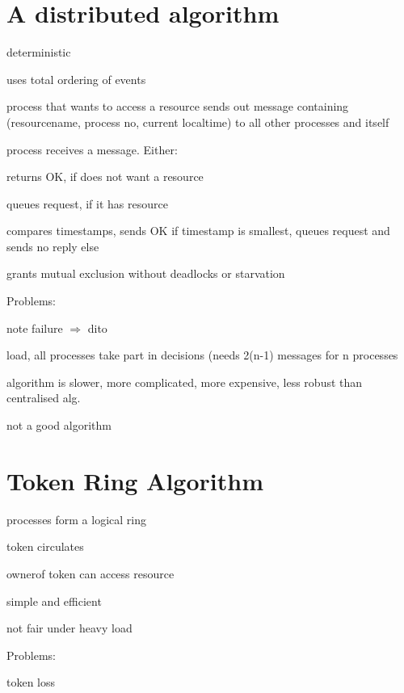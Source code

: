 \documentclass[ngerman,a4paper]{report}
\begin{document}
\section{A distributed algorithm}
\begin{compactitem}
	\item deterministic
	\item uses total ordering of events
	\item process that wants to access a resource sends out message containing (resourcename, process no, current localtime) to all other processes and itself
	\item process receives a message. Either:\\
		\begin{compactenum}
			\item returns OK, if does not want a resource
			\item queues request, if it has resource
			\item compares timestamps, sends OK if timestamp is smallest, queues request and sends no reply else
		\end{compactenum}
	\item grants mutual exclusion without deadlocks or starvation
\end{compactitem}
Problems: \begin{compactitem}
		
	\item note failure $\Rightarrow$ dito
	\item load, all processes take part in decisions (needs 2(n-1) messages for n processes
	\item algorithm is slower, more complicated, more expensive, less robust than centralised alg.
	\item not a good algorithm
\end{compactitem}
\section{Token Ring Algorithm}
\begin{compactitem}
	\item processes form a logical ring
	\item token circulates
	\item ownerof token can access resource
	\item simple and efficient
	\item not fair under heavy load
\end{compactitem}
Problems:\begin{compactitem}
	\item token loss
	\item 
\end{compactitem}
\end{document}
